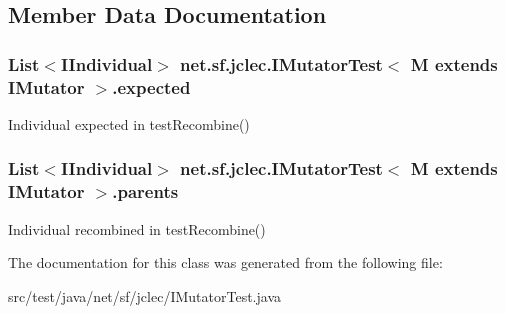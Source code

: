 \subsection{Member Data Documentation}
\hypertarget{classnet_1_1sf_1_1jclec_1_1_i_mutator_test_3_01_m_01extends_01_i_mutator_01_4_a7b5d60cf857bea9337b1c3e7d9124670}{
\subsubsection[{expected}]{\setlength{\rightskip}{0pt plus 5cm}List$<${\bf I\-Individual}$>$ net.\-sf.\-jclec.\-I\-Mutator\-Test$<$ M extends {\bf I\-Mutator} $>$.expected\hspace{0.3cm}{\ttfamily [protected]}}}\label{classnet_1_1sf_1_1jclec_1_1_i_mutator_test_3_01_m_01extends_01_i_mutator_01_4_a7b5d60cf857bea9337b1c3e7d9124670}
Individual expected in test\-Recombine() \hypertarget{classnet_1_1sf_1_1jclec_1_1_i_mutator_test_3_01_m_01extends_01_i_mutator_01_4_a71b589875ad03dea370f15878842cfdf}{
\subsubsection[{parents}]{\setlength{\rightskip}{0pt plus 5cm}List$<${\bf I\-Individual}$>$ net.\-sf.\-jclec.\-I\-Mutator\-Test$<$ M extends {\bf I\-Mutator} $>$.parents\hspace{0.3cm}{\ttfamily [protected]}}}\label{classnet_1_1sf_1_1jclec_1_1_i_mutator_test_3_01_m_01extends_01_i_mutator_01_4_a71b589875ad03dea370f15878842cfdf}
Individual recombined in test\-Recombine() 

The documentation for this class was generated from the following file\-:\begin{DoxyCompactItemize}
\item 
src/test/java/net/sf/jclec/I\-Mutator\-Test.\-java\end{DoxyCompactItemize}
